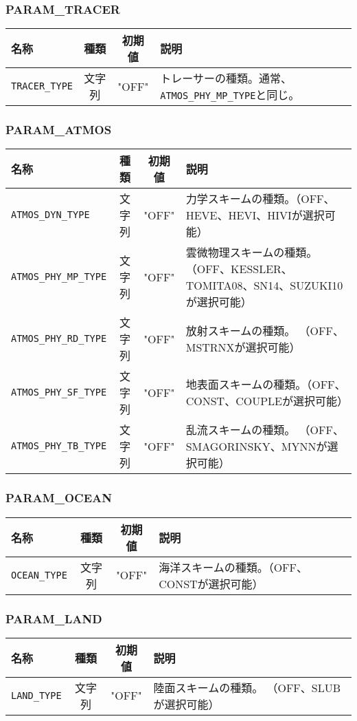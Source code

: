 \subsubsection{PARAM\_TRACER}
\begin{tabularx}{150mm}{|l|c|c|X|} \hline
 \rowcolor[gray]{0.9} 名称 & 種類 & 初期値 & 説明 \\ \hline
 \verb|TRACER_TYPE| & 文字列 & "OFF" & トレーサーの種類。通常、\verb|ATMOS_PHY_MP_TYPE|と同じ。 \\ \hline
\end{tabularx}


\subsubsection{PARAM\_ATMOS}
\begin{tabularx}{150mm}{|l|c|c|X|} \hline
 \rowcolor[gray]{0.9} 名称 & 種類 & 初期値 & 説明 \\ \hline
 \verb|ATMOS_DYN_TYPE| & 文字列 & "OFF" & 力学スキームの種類。（OFF、HEVE、HEVI、HIVIが選択可能） \\ \hline
 \verb|ATMOS_PHY_MP_TYPE| & 文字列 & "OFF" & 雲微物理スキームの種類。（OFF、KESSLER、TOMITA08、SN14、SUZUKI10が選択可能）\\ \hline
 \verb|ATMOS_PHY_RD_TYPE| & 文字列 & "OFF" & 放射スキームの種類。 （OFF、MSTRNXが選択可能）\\ \hline
 \verb|ATMOS_PHY_SF_TYPE| & 文字列 & "OFF" & 地表面スキームの種類。（OFF、CONST、COUPLEが選択可能） \\ \hline
 \verb|ATMOS_PHY_TB_TYPE| & 文字列 & "OFF" & 乱流スキームの種類。 （OFF、SMAGORINSKY、MYNNが選択可能）\\ \hline
\end{tabularx}


\subsubsection{PARAM\_OCEAN}
\begin{tabularx}{150mm}{|l|c|c|X|} \hline
 \rowcolor[gray]{0.9} 名称 & 種類 & 初期値 & 説明 \\ \hline
 \verb|OCEAN_TYPE| & 文字列 & "OFF" & 海洋スキームの種類。（OFF、CONSTが選択可能） \\ \hline
\end{tabularx}


\subsubsection{PARAM\_LAND}
\begin{tabularx}{150mm}{|l|c|c|X|} \hline
 \rowcolor[gray]{0.9} 名称 & 種類 & 初期値 & 説明 \\ \hline
 \verb|LAND_TYPE| & 文字列 & "OFF" & 陸面スキームの種類。 （OFF、SLUBが選択可能）\\ \hline
\end{tabularx}


